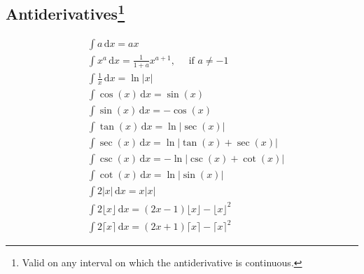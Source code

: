 \documentclass[letterpaper,9pt,fleqn]{extarticle}
\begin{document}
\begin{multicols*}{3}
\vfill
\newpage

\section*{Antiderivatives\footnote{Valid on any interval on which the antiderivative is continuous.}}
\vspace{-0.75in}
\begin{minipage}{0.33333333333333\textwidth}
\begin{align*}
&\int a   \, \mathrm{d} x  = a x \\
&\int x^a  \, \mathrm{d} x  = \frac{1}{1+a} x^{a+1},  \quad \mbox{ if } a \neq -1 \\
&\int \frac{1}{x}  \, \mathrm{d} x  = \ln \big | x \big | \\
&\int {\left. \cos{(x)} \, \mathrm{d} x\right.}=\sin{(x)}\\
&\int {\left. \sin{(x)} \, \mathrm{d} x\right.}=-\cos{(x)}\\
&\int {\left. \tan{(x)} \, \mathrm{d} x\right.}=\ln{ \big| \sec(x)  \big|}\\
&\int {\left. \sec{(x)} \, \mathrm{d} x\right.}=\ln{ \big | \tan{(x)}+\sec{(x)} \big |}\\
&\int {\left. \csc{(x)} \, \mathrm{d} x\right.}  =-\ln  \big | \csc(x)+\cot(x) \big | \\
&\int \cot(x) \, \mathrm{d} x = \ln \big | \sin (x) \big | \\
&\int 2 \big |x \big | \, \mathrm{d} x  = x \big |x \big |\\
&\int 2 \lfloor x \rfloor  \, \mathrm{d} x = (2 x - 1) \lfloor x \rfloor - \lfloor x \rfloor^2\\
&\int 2 \lceil x \rceil  \, \mathrm{d} x = (2 x + 1) \lceil x \rceil - \lceil x \rceil^2
\end{align*}


\end{minipage}
\end{multicols*}
\end{document}
